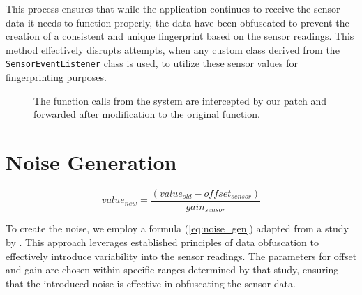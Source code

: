 \documentclass[11pt,
  oneside,openany,    %
]{scrreprt}
\begin{document}
This process ensures that while the application continues to receive the sensor data it needs to function properly, the data have been obfuscated to prevent the creation of a consistent and unique fingerprint based on the sensor readings.
This method effectively disrupts attempts, when any custom class derived from the \verb|SensorEventListener| class is used, to utilize these sensor values for fingerprinting purposes.

\begin{figure}[h]
  \centering
  \captionsetup{justification=centering}
  \caption{The function calls from the system are intercepted by our patch and forwarded after modification to the original function.}
  \label{fig:patch}
\end{figure}

\section{Noise Generation}
\label{sec:noise_gen}
\begin{equation}
  value_{new} = \frac{(value_{old} - offset_{sensor})}{gain_{sensor}}
  \label{eq:noise_gen}
\end{equation}

To create the noise, we employ a formula (\ref{eq:noise_gen}) adapted from a study by \citeauthor{DBLP:conf/ndss/DasBC16} \cite{DBLP:conf/ndss/DasBC16}.
This approach leverages established principles of data obfuscation to effectively introduce variability into the sensor readings.
The parameters for offset and gain are chosen within specific ranges determined by that study, ensuring that the introduced noise is effective in obfuscating the sensor data.
\end{document}
